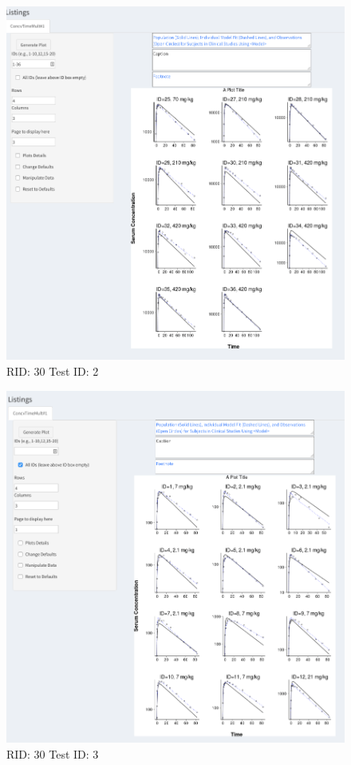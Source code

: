 \begin{figure}[H]
\includegraphics[width=.8\textwidth]{screencaps/30-2-3.png}
\caption{RID: 30 Test ID: 2}
\end{figure}
\begin{figure}[H]
\includegraphics[width=.8\textwidth]{screencaps/30-3-1.png}
\caption{RID: 30 Test ID: 3}
\end{figure}
